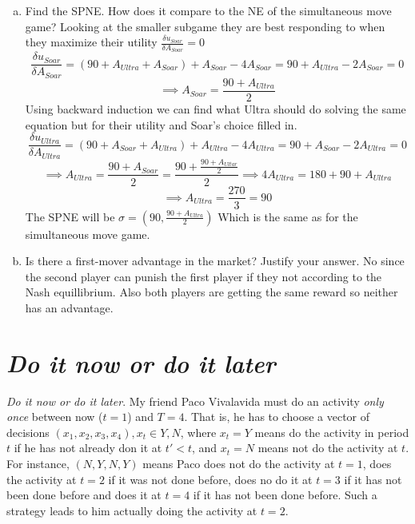 \documentclass{article}
\begin{document}
\begin{enumerate}[(a)]
\item Find the SPNE. How does it compare to the NE of the simultaneous move game?
\newline
Looking at the smaller subgame they are best responding to when they maximize their utility $\frac{\delta u_{Soar}}{\delta A_{Soar}} = 0$
$$\frac{\delta u_{Soar}}{\delta A_{Soar}} = (90 + A_{Ultra} + A_{Soar}) + A_{Soar} - 4A_{Soar} = 90 + A_{Ultra} - 2A_{Soar} = 0$$
$$\implies A_{Soar} = \frac{90 + A_{Ultra}}{2}$$
Using backward induction we can find what Ultra should do solving the same equation but for their utility and Soar's choice filled in.
$$\frac{\delta u_{Ultra}}{\delta A_{Ultra}} = (90 + A_{Soar} + A_{Ultra}) + A_{Ultra} - 4A_{Ultra} = 90 + A_{Soar} - 2A_{Ultra} = 0$$
$$\implies A_{Ultra} = \frac{90 + A_{Soar}}{2} =  \frac{90 +  \frac{90 + A_{Ultar}}{2}}{2} \implies 4A_{Ultra} = 180 + 90 + A_{Ultra}$$
$$\implies A_{Ultra} = \frac{270}{3} = 90 $$
The SPNE will be $\sigma=(90, \frac{90 + A_{Ultra}}{2})$ Which is the same as for the simultaneous move game.


\item Is there a first-mover advantage in the market? Justify your answer.
\newline
No since the second player can punish the first player if they not according to the Nash equillibrium.
Also both players are getting the same reward so neither has an advantage.

\end{enumerate}

\section{\emph{Do it now or do it later}}
\emph{Do it now or do it later}. My friend Paco Vivalavida must do an activity \emph{only once} between now ($t = 1$) and $T = 4$.
That is, he has to choose a vector of decisions $(x_1,x_2,x_3,x_4), x_t \in {Y,N}$, where $x_t = Y$ means do the activity in period $t$ if he has not already don it at $t'<t$, and $x_t = N$ means not do the activity at $t$.
For instance, $(N,Y,N,Y)$ means Paco does not do the activity at $t = 1$, does the activity at $t = 2$ if it was not done before, does no do it at $t = 3$ if it has not been done before and does it at $t=4$ if it has not been done before.
Such a strategy leads to him actually doing the activity at $t = 2$.
\end{document}
